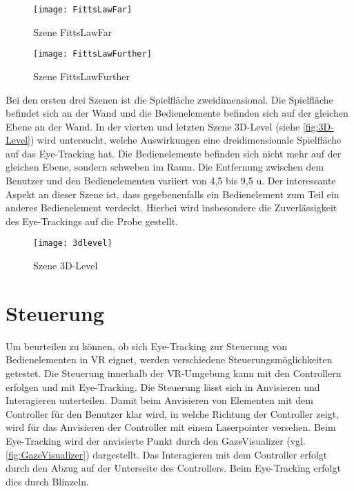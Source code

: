 \begin{figure}[!htbp]
	\centering
	\texttt{[image: FittsLawFar]}
	\caption[Szene FittsLawFar]{Szene FittsLawFar}
	\label{fig:FittsLawFar}
\end{figure}

\begin{figure}[!htbp]
	\centering
	\texttt{[image: FittsLawFurther]}
	\caption[Szene FittsLawFurther]{Szene FittsLawFurther}
	\label{fig:FittsLawFurther}
\end{figure}

Bei den ersten drei Szenen ist die Spielfläche zweidimensional. Die Spielfläche befindet sich an der Wand und die Bedienelemente befinden sich auf der gleichen Ebene an der Wand. In der vierten und letzten Szene \glqq 3D-Level\grqq{} (siehe \autoref{fig:3D-Level}) wird untersucht, welche Auswirkungen eine dreidimensionale Spielfläche auf das Eye-Tracking hat. Die Bedienelemente befinden sich nicht mehr auf der gleichen Ebene, sondern schweben im Raum. Die Entfernung zwischen dem Benutzer und den Bedienelementen variiert von 4,5 bis 9,5 \ac{u}. Der interessante Aspekt an dieser Szene ist, dass gegebenenfalls ein Bedienelement zum Teil ein anderes Bedienelement verdeckt. Hierbei wird insbesondere die Zuverlässigkeit des Eye-Trackings auf die Probe gestellt. 

\begin{figure}[!htbp]
	\centering
	\texttt{[image: 3dlevel]}
	\caption[Szene 3D-Level]{Szene 3D-Level}
	\label{fig:3D-Level}
\end{figure}

\section{Steuerung}
\label{section:controls}
Um beurteilen zu können, ob sich Eye-Tracking zur Steuerung von Bedienelementen in \ac{VR} eignet, werden verschiedene Steuerungsmöglichkeiten getestet. Die Steuerung innerhalb der \ac{VR}-Umgebung kann mit den Controllern erfolgen und mit Eye-Tracking. Die Steuerung lässt sich in Anvisieren und Interagieren unterteilen. Damit beim Anvisieren von Elementen mit dem Controller für den Benutzer klar wird, in welche Richtung der Controller zeigt, wird für das Anvisieren der Controller mit einem Laserpointer versehen. Beim Eye-Tracking wird der anvisierte Punkt durch den GazeVisualizer (vgl. \autoref{fig:GazeVisualizer}) dargestellt. Das Interagieren mit dem Controller erfolgt durch den Abzug auf der Unterseite des Controllers. Beim Eye-Tracking erfolgt dies durch Blinzeln.


